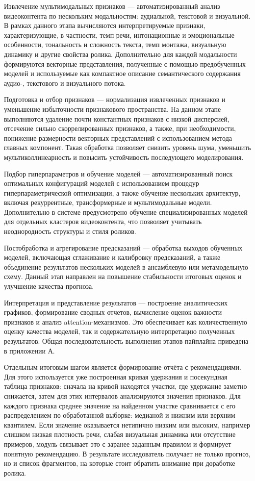 \documentclass[times]{itmo-student-thesis}
\begin{document}
Извлечение мультимодальных признаков — автоматизированный анализ видеоконтента по нескольким модальностям: аудиальной, текстовой и визуальной. В рамках данного этапа вычисляются интерпретируемые признаки, характеризующие, в частности, темп речи, интонационные и эмоциональные особенности, тональность и сложность текста, темп монтажа, визуальную динамику и другие свойства ролика. Дополнительно для каждой модальности формируются векторные представления, полученные с помощью предобученных моделей и используемые как компактное описание семантического содержания аудио-, текстового и визуального потока.

Подготовка и отбор признаков — нормализация извлеченных признаков и уменьшение избыточности признакового пространства. На данном этапе выполняются удаление почти константных признаков с низкой дисперсией, отсечение сильно скоррелированных признаков, а также, при необходимости, понижение размерности векторных представлений с использованием метода главных компонент. Такая обработка позволяет снизить уровень шума, уменьшить мультиколлинеарность и повысить устойчивость последующего моделирования.

Подбор гиперпараметров и обучение моделей — автоматизированный поиск оптимальных конфигураций моделей с использованием процедур гиперпараметрической оптимизации, а также обучение нескольких архитектур, включая рекуррентные, трансформерные и мультимодальные модели. Дополнительно в системе предусмотрено обучение специализированных моделей для отдельных кластеров видеоконтента, что позволяет учитывать неоднородность структуры и стиля роликов.

Постобработка и агрегирование предсказаний — обработка выходов обученных моделей, включающая сглаживание и калибровку предсказаний, а также объединение результатов нескольких моделей в ансамблевую или метамодельную схему. Данный этап направлен на повышение стабильности итоговых оценок и улучшение качества прогноза.

Интерпретация и представление результатов — построение аналитических графиков, формирование сводных отчетов, вычисление оценок важности признаков и анализ attention-механизмов. Это обеспечивает как количественную оценку качества моделей, так и содержательную интерпретацию полученных результатов. Общая последовательность выполнения этапов пайплайна приведена в приложении А.

Отдельным итоговым шагом является формирование отчёта с рекомендациями. Для этого используется уже построенная кривая удержания и посекундная таблица признаков: сначала на кривой находятся участки, где удержание заметно снижается, затем для этих интервалов анализируются значения признаков. Для каждого признака среднее значение на найденном участке сравнивается с его распределением по обработанной выборке: медианой и нижним или верхним квантилем. Если значение оказывается нетипично низким или высоким, например слишком низкая плотность речи, слабая визуальная динамика или отсутствие примеров, модуль связывает это с заранее заданным правилом и формирует понятную рекомендацию. В результате исследователь получает не только прогноз, но и список фрагментов, на которые стоит обратить внимание при доработке ролика.
\end{document}
